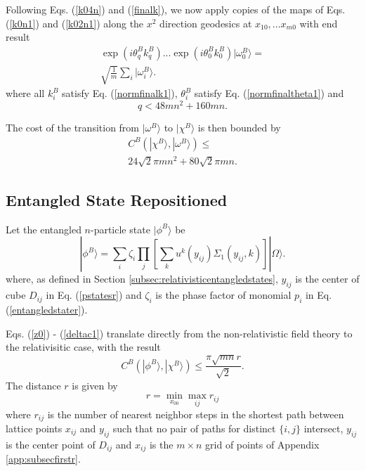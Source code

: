 \documentclass[12pt,amsmath,amssymb,onecolumn]{revtex4-2}
\begin{document}
Following Eqs. (\ref{k04n}) and (\ref{finalk}), we now
apply copies of the maps
of Eqs. (\ref{k0n1}) and (\ref{k02n1}) along the $x^2$ direction
geodesics at $x_{10}, ... x_{m0}$ with end result
\begin{multline}
\label{finalk1}
\exp( i \theta^B_q k^B_q) ... \exp( i \theta^B_0 k^B_0) |\omega^B_0 \rangle  = \\
\sqrt{\frac{1}{m}} \sum_i |\omega^B_i \rangle .
\end{multline}
where all $k^B_i$ satisfy Eq. (\ref{normfinalk1}),  $\theta^B_i$
satisfy Eq. (\ref{normfinaltheta1}) and
\begin{equation}
  \label{qbound}
  q <  48 m n^2 + 160 m n.
\end{equation}

The cost of the transition from $|\omega^B \rangle $ to $|\chi^B \rangle $ is then bounded
by
\begin{multline}
\label{deltacr}
C^B( |\chi^B \rangle , |\omega^B \rangle ) \le \\ 24 \sqrt{2} \pi m n^2 + 80 \sqrt{2} \pi m n.
\end{multline}


\subsection{\label{app:subsectionsecondr}Entangled State Repositioned}


Let the entangled $n$-particle state
$|\phi^B \rangle $ be
\begin{equation}
\label{phinpoints1}
|\phi^B \rangle  = \sum_{i} \zeta_i \prod_j[ \sum_k u^k( y_{ij}) \Sigma_1( y_{ij}, k)] |\Omega \rangle .
\end{equation}
where, as defined in Section \ref{subsec:relativisticentangledstates},
$y_{ij}$ is the center of cube $D_{ij}$ in Eq. (\ref{pstatesr})
and $\zeta_i$ is the phase factor of monomial $p_i$ in
Eq. (\ref{entangledstater}).

Eqs. (\ref{z0}) - (\ref{deltac1}) translate directly
from the non-relativistic field theory to the relativisitic case,
with the result
\begin{equation}
\label{deltac0r}
C^B( |\phi^B \rangle , |\chi^B \rangle ) \le \frac{ \pi \sqrt{mn} r}{\sqrt{2}}.
\end{equation}
The distance $r$ is given by
\begin{equation}
  \label{defsbar1r}
  r = \min_{x_{00}} \max_{ij} r_{ij}
\end{equation}
where $r_{ij}$ is the number of nearest
neighbor steps in the
shortest path between
lattice points $x_{ij}$ and $y_{ij}$
such that no pair of paths for distinct
$\{i, j\}$ intersect,
$y_{ij}$ is the center point of $D_{ij}$
and $x_{ij}$ is the $m \times n$ grid
of points of Appendix \ref{app:subsecfirstr}.
\end{document}
